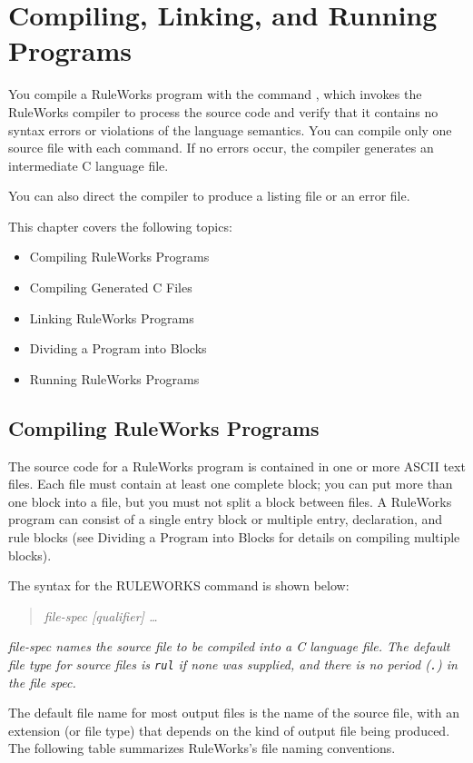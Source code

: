 \chapter{Compiling, Linking, and Running Programs}
\label{c:compiling}

You compile a RuleWorks program with the command
, which invokes the RuleWorks compiler to
process the source code and verify that it contains no
syntax errors or violations of the language semantics.
You can compile only one source file with each 
command. If no errors occur, the compiler generates an
intermediate C language file.

You can also direct the compiler to produce a listing
file or an error file.

This chapter covers the following topics:
\begin{itemize}
\item Compiling RuleWorks Programs
\item Compiling Generated C Files
\item Linking RuleWorks Programs
\item Dividing a Program into Blocks
\item Running RuleWorks Programs
\end{itemize}

\section{Compiling RuleWorks Programs}

The source code for a RuleWorks program is contained in
one or more ASCII text files. Each file must contain at
least one complete block; you can put more than one block
into a file, but you must not split a block between
files. A RuleWorks program can consist of a single entry
block or multiple entry, declaration, and rule blocks
(see Dividing a Program into Blocks for details on
compiling multiple blocks).

The syntax for the RULEWORKS command is shown below:
\begin{quote}
 \it{file-spec} [\it{qualifier}] \ldots
\end{quote}
\it{file-spec} names the source file to be compiled into a C
language file. The default file type for source files is
\verb|rul| if none was supplied, and there is no period (\verb|.|) in
the file spec.

The default file name for most output files is the name of the source
file, with an extension (or file type) that depends on the kind of
output file being produced. The following table summarizes RuleWorks's
file naming conventions.

